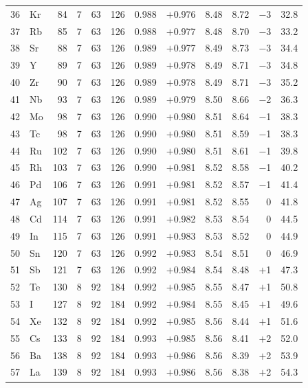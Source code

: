 \documentclass[twocolumn]{iopjournal}
\begin{document}
\begin{longtable}{r l r r r r r r r r r r}
36 & Kr &  84 & 7 &  63 & 126 & 0.988 & $+$0.976 &  8.48 &  8.72 & $-$3  & 32.8 \\
37 & Rb &  85 & 7 &  63 & 126 & 0.988 & $+$0.977 &  8.48 &  8.70 & $-$3  & 33.2 \\
38 & Sr &  88 & 7 &  63 & 126 & 0.989 & $+$0.977 &  8.49 &  8.73 & $-$3  & 34.4 \\
39 & Y  &  89 & 7 &  63 & 126 & 0.989 & $+$0.978 &  8.49 &  8.71 & $-$3  & 34.8 \\
40 & Zr &  90 & 7 &  63 & 126 & 0.989 & $+$0.978 &  8.49 &  8.71 & $-$3  & 35.2 \\
41 & Nb &  93 & 7 &  63 & 126 & 0.989 & $+$0.979 &  8.50 &  8.66 & $-$2  & 36.3 \\
42 & Mo &  98 & 7 &  63 & 126 & 0.990 & $+$0.980 &  8.51 &  8.64 & $-$1  & 38.3 \\
43 & Tc &  98 & 7 &  63 & 126 & 0.990 & $+$0.980 &  8.51 &  8.59 & $-$1  & 38.3 \\
44 & Ru & 102 & 7 &  63 & 126 & 0.990 & $+$0.980 &  8.51 &  8.61 & $-$1  & 39.8 \\
45 & Rh & 103 & 7 &  63 & 126 & 0.990 & $+$0.981 &  8.52 &  8.58 & $-$1  & 40.2 \\
46 & Pd & 106 & 7 &  63 & 126 & 0.991 & $+$0.981 &  8.52 &  8.57 & $-$1  & 41.4 \\
47 & Ag & 107 & 7 &  63 & 126 & 0.991 & $+$0.981 &  8.52 &  8.55 &  $0$  & 41.8 \\
48 & Cd & 114 & 7 &  63 & 126 & 0.991 & $+$0.982 &  8.53 &  8.54 &  $0$  & 44.5 \\
49 & In & 115 & 7 &  63 & 126 & 0.991 & $+$0.983 &  8.53 &  8.52 &  $0$  & 44.9 \\
50 & Sn & 120 & 7 &  63 & 126 & 0.992 & $+$0.983 &  8.54 &  8.51 &  $0$  & 46.9 \\
51 & Sb & 121 & 7 &  63 & 126 & 0.992 & $+$0.984 &  8.54 &  8.48 & $+$1  & 47.3 \\
52 & Te & 130 & 8 &  92 & 184 & 0.992 & $+$0.985 &  8.55 &  8.47 & $+$1  & 50.8 \\
53 & I  & 127 & 8 &  92 & 184 & 0.992 & $+$0.984 &  8.55 &  8.45 & $+$1  & 49.6 \\
54 & Xe & 132 & 8 &  92 & 184 & 0.992 & $+$0.985 &  8.56 &  8.44 & $+$1  & 51.6 \\
55 & Cs & 133 & 8 &  92 & 184 & 0.993 & $+$0.985 &  8.56 &  8.41 & $+$2  & 52.0 \\
56 & Ba & 138 & 8 &  92 & 184 & 0.993 & $+$0.986 &  8.56 &  8.39 & $+$2  & 53.9 \\
57 & La & 139 & 8 &  92 & 184 & 0.993 & $+$0.986 &  8.56 &  8.38 & $+$2  & 54.3 \\

\end{longtable}
\end{document}
